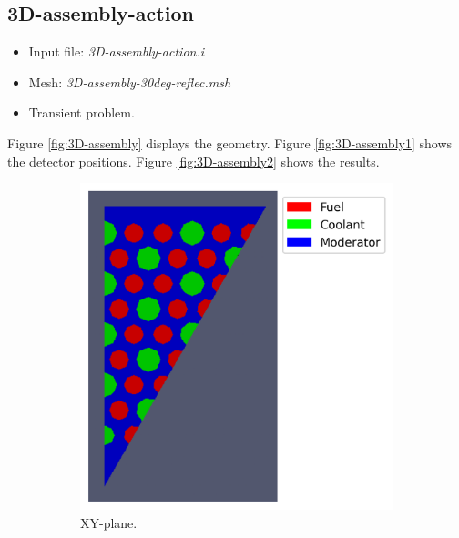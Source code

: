 \documentclass[11pt,letterpaper]{article}
\begin{document}
\subsection{3D-assembly-action}

	\begin{itemize}
		\item Input file: \textit{3D-assembly-action.i}
		\item Mesh: \textit{3D-assembly-30deg-reflec.msh}
		\item Transient problem.
	\end{itemize}

Figure \ref{fig:3D-assembly} displays the geometry.
Figure \ref{fig:3D-assembly1} shows the detector positions.
Figure \ref{fig:3D-assembly2} shows the results.

	\begin{figure}[htbp!]
		\centering
		\begin{subfigure}[t]{0.4\textwidth}
			\centering
			\includegraphics[width=\linewidth]{3D-assembly-30deg-reflec-meshB1}
			\caption{XY-plane.}
		\end{subfigure}
		\begin{subfigure}[t]{0.4\textwidth}
			\centering

\end{subfigure}
\end{figure}
\end{document}
